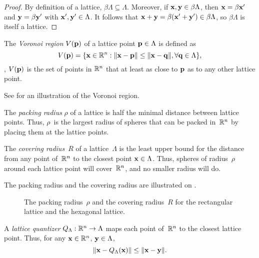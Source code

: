 \begin{subappendices}
  \begin{proof}
    By definition of a lattice, $\beta \Lambda \subseteq \Lambda$. Moreover, if
    $\mathbf{x}, \mathbf{y} \in \beta \Lambda$, then $\mathbf{x} = \beta \mathbf{x}'$ and $\mathbf{y} = \beta \mathbf{y}'$ with
    $\mathbf{x}', \mathbf{y}' \in \Lambda$. It follows that $\mathbf{x} + \mathbf{y} = \beta (\mathbf{x}' + \mathbf{y}') \in \beta
    \Lambda$, so $\beta\Lambda$ is itself a lattice.
  \end{proof}

  \begin{definition}
    The \emph{Voronoi region} $V(\mathbf{p})$ of a lattice point $\mathbf{p} \in \Lambda$ is
    defined as \begin{equation*} V(\mathbf{p}) = \{\mathbf{x} \in \mathbb{R}^n : \|\mathbf{x} - \mathbf{p}\| \le \|\mathbf{x} -
      \mathbf{q}\|, \forall \mathbf{q} \in \Lambda\}, \end{equation*} \ie, $V(\mathbf{p})$ is the set of
      points in $\mathbb{R}^n$ that at least as close to $\mathbf{p}$ as to any other lattice
      point.
  \end{definition}
  See  for an illustration of the Voronoi region.

  \begin{definition}
    The \emph{packing radius} $\rho$ of a lattice is half the minimal distance
    between lattice points. Thus, $\rho$~is the largest radius of spheres that
    can be packed in~$\mathbb{R}^n$ by placing them at the lattice points.
  \end{definition}

  \begin{definition}
    The \emph{covering radius}~$R$ of a lattice~$\Lambda$ is the least upper
    bound for the distance from any point of~$\mathbb{R}^n$ to the closest point $\mathbf{x} \in
    \Lambda$. Thus, spheres of radius~$\rho$ around each lattice point will
    cover~$\mathbb{R}^n$, and no smaller radius will do.~\cite{ConwayS1988}
  \end{definition}

  The packing radius and the covering radius are illustrated on
  .
  \begin{figure}
    \begin{center}
      
    \end{center}
    \caption{The packing radius~$\rho$ and the covering radius~$R$ for the
    rectangular lattice and the hexagonal lattice.}
    \label{fig:packingcoveringr}
  \end{figure}

  \begin{definition}
    \label{def:latticequant}
    A \emph{lattice quantizer} ${Q_{\Lambda}} : \mathbb{R}^n \rightarrow \Lambda$ maps each point
    of~$\mathbb{R}^n$ to the closest lattice point. Thus, for any $\mathbf{x} \in \mathbb{R}^n$, $\mathbf{y} \in
    \Lambda$,
    \begin{equation*}
      \| \mathbf{x} - {Q_{\Lambda}}(\mathbf{x}) \| \le \|\mathbf{x} - \mathbf{y}\|.
    \end{equation*}
  \end{definition}


\end{subappendices}
